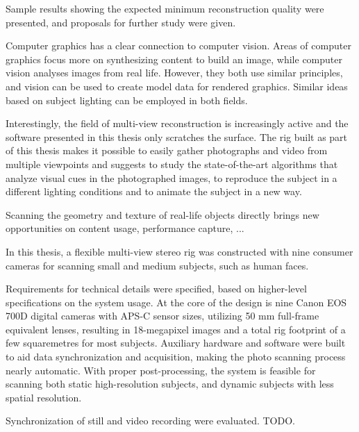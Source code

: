 Sample results showing the expected minimum reconstruction quality were presented, and proposals for further study were given.

Computer graphics has a clear connection to computer vision.
Areas of computer graphics focus more on synthesizing content to build an image, while computer vision analyses images from real life.
However, they both use similar principles, and vision can be used to create model data for rendered graphics.
Similar ideas based on subject lighting can be employed in both fields.

Interestingly, the field of multi-view reconstruction is increasingly active and the software presented in this thesis only scratches the surface.
The rig built as part of this thesis makes it possible to easily gather photographs and video from multiple viewpoints and suggests to study the state-of-the-art algorithms that analyze visual cues in the photographed images, to reproduce the subject in a different lighting conditions and to animate the subject in a new way.

Scanning the geometry and texture of real-life objects directly brings new opportunities on content usage, performance capture, ...

In this thesis, a flexible multi-view stereo rig was constructed with nine consumer cameras for scanning small and medium subjects, such as human faces.

Requirements for technical details were specified, based on higher-level specifications on the system usage.
At the core of the design is nine Canon EOS 700D digital cameras with APS-C sensor sizes, utilizing 50 mm full-frame equivalent lenses, resulting in 18-megapixel images and a total rig footprint of a few squaremetres for most subjects.
Auxiliary hardware and software were built to aid data synchronization and acquisition, making the photo scanning process nearly automatic.
With proper post-processing, the system is feasible for scanning both static high-resolution subjects, and dynamic subjects with less spatial resolution.

Synchronization of still and video recording were evaluated. TODO.

